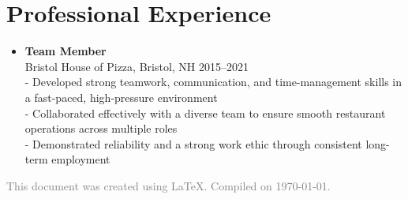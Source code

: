 \documentclass[11pt]{article}
\begin{document}
\section*{Professional Experience}
\vspace{-0.1in}
\begin{itemize}[leftmargin=*]
    \item \textbf{Team Member} \\
    Bristol House of Pizza, Bristol, NH \hfill 2015--2021 \\
    - Developed strong teamwork, communication, and time-management skills in a fast-paced, high-pressure environment \\
    - Collaborated effectively with a diverse team to ensure smooth restaurant operations across multiple roles \\
    - Demonstrated reliability and a strong work ethic through consistent long-term employment
\end{itemize}

\vspace{0.2in}
\begin{center}
\footnotesize
\textcolor{gray}{This document was created using \LaTeX. Compiled on \today.}
\end{center}
\end{document}
